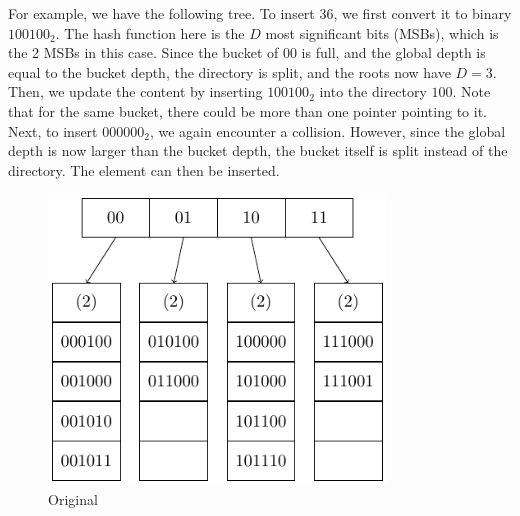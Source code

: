 \begin{minipage}{0.5\textwidth}
For example, we have the following tree. To insert 36, we first convert it to binary \(100100_2\). The hash function here is the \(D\) most significant bits (MSBs), which is the 2 MSBs in this case. Since the bucket of \(00\) is full, and the global depth is equal to the bucket depth, the directory is split, and the roots now have \(D = 3\). \\[3pt]
Then, we update the content by inserting \(100100_2\) into the directory \(100\). Note that for the same bucket, there could be more than one pointer pointing to it. \\[3pt]
Next, to insert \(000000_2\), we again encounter a collision. However, since the global depth is now larger than the bucket depth, the bucket itself is split instead of the directory. The element can then be inserted.
\end{minipage}
\begin{minipage}{0.5\textwidth}
\begin{figure}[H]
  \centering
  \includegraphics[width=0.8\textwidth]{Figure/EH2.pdf}
  \caption{Original}
\end{figure}
\end{minipage}

